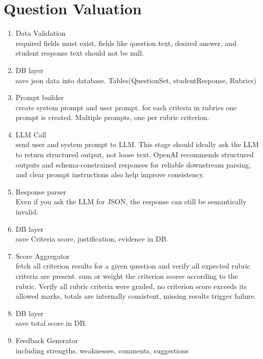 \section{Question Valuation}

    \begin{enumerate}
        \item[Stage 1] Data Validation \\  required fields must exist. fields like question text, desired answer, and student response text should not be null. 
        \item[Stage 2] DB layer \\ save json data into database. Tables(QuestionSet, studentResponse, Rubrics)
        \item[Stage 3] Prompt builder \\ create system prompt and user prompt. for each criteria in rubrics one prompt is created. Multiple prompts, one per rubric criterion.
        \item[Stage 4] LLM Call \\  send user and system prompt to LLM. This stage should ideally ask the LLM to return structured output, not loose text. OpenAI recommends structured outputs and schema-constrained responses for reliable downstream parsing, and clear prompt instructions also help improve consistency.
        \item[Stage 5] Response parser \\ Even if you ask the LLM for JSON, the response can still be semantically invalid.  
        \item[Stage 6] DB layer \\ save Criteria score, justification, evidence in DB.
        \item[Stage 7] Score Aggregator \\ fetch all criterion results for a given question and verify all expected rubric criteria are present. sum or weight the criterion scores according to the rubric. Verify all rubric criteria were graded, no criterion score exceeds its allowed marks, totals are internally consistent, missing results trigger failure. 
        \item[Stage 8] DB layer \\ save total score in DB.
        \item[Stage 9] Feedback Generator \\ including strengths,  weaknesses, comments, suggestions
    \end{enumerate}